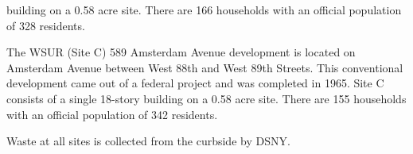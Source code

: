 building on a 0.58 acre site. There are 166 households with an official population of 328 residents. \par \vspace{.7\baselineskip}The WSUR (Site C) 589 Amsterdam Avenue development is located on Amsterdam Avenue between West 88th and West 89th Streets. This conventional development came out of a federal project and was completed in 1965. Site C consists of a single 18-story building on a 0.58 acre site. There are 155 households with an official population of 342 residents.\par \vspace{.7\baselineskip}Waste at all sites is collected from the curbside by DSNY.